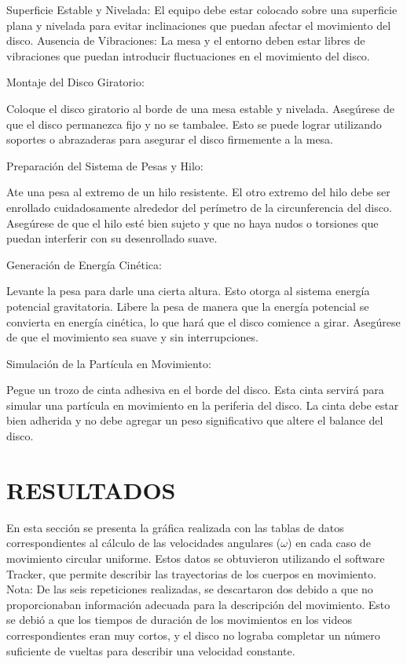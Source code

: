 \documentclass[journal]{IEEEtran}
\begin{document}
Superficie Estable y Nivelada: El equipo debe estar colocado sobre una superficie plana y nivelada para evitar inclinaciones que puedan afectar el movimiento del disco.
Ausencia de Vibraciones: La mesa y el entorno deben estar libres de vibraciones que puedan introducir fluctuaciones en el movimiento del disco.

Montaje del Disco Giratorio:

Coloque el disco giratorio al borde de una mesa estable y nivelada. Asegúrese de que el disco permanezca fijo y no se tambalee. Esto se puede lograr utilizando soportes o abrazaderas para asegurar el disco firmemente a la mesa.

Preparación del Sistema de Pesas y Hilo:

Ate una pesa al extremo de un hilo resistente. El otro extremo del hilo debe ser enrollado cuidadosamente alrededor del perímetro de la circunferencia del disco.
Asegúrese de que el hilo esté bien sujeto y que no haya nudos o torsiones que puedan interferir con su desenrollado suave.

Generación de Energía Cinética:

Levante la pesa para darle una cierta altura. Esto otorga al sistema energía potencial gravitatoria.
Libere la pesa de manera que la energía potencial se convierta en energía cinética, lo que hará que el disco comience a girar. Asegúrese de que el movimiento sea suave y sin interrupciones.

Simulación de la Partícula en Movimiento:

Pegue un trozo de cinta adhesiva en el borde del disco. Esta cinta servirá para simular una partícula en movimiento en la periferia del disco.
La cinta debe estar bien adherida y no debe agregar un peso significativo que altere el balance del disco.
\hfill 

\section{RESULTADOS}

En esta sección se presenta la gráfica realizada con las tablas de datos correspondientes al cálculo de las velocidades angulares ($\omega$) en cada caso de movimiento circular uniforme. Estos datos se obtuvieron utilizando el software Tracker, que permite describir las trayectorias de los cuerpos en movimiento.\\

Nota: De las seis repeticiones realizadas, se descartaron dos debido a que no proporcionaban información adecuada para la descripción del movimiento. Esto se debió a que los tiempos de duración de los movimientos en los videos correspondientes eran muy cortos, y el disco no lograba completar un número suficiente de vueltas para describir una velocidad constante.\\
\end{document}
